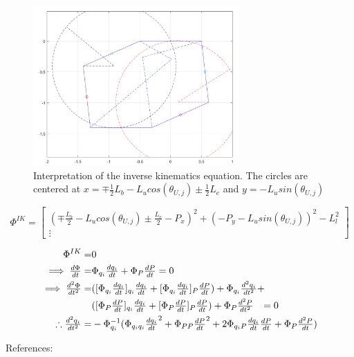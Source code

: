 \begin{figure}[h!]
	\centering
	\includegraphics[width=0.7\textwidth]{figures/Inverse_2D.png}                                                              
	\caption[Interpretation of the inverse kinematics equation]{Interpretation of the inverse kinematics equation. The circles are centered at $x=\mp\tfrac{1}{2}L_b-L_u cos(\theta_{U,j})\pm\tfrac{1}{2}L_e$  and $y=-L_u sin(\theta_{U,j})$}
	\label{fig:inverse2D}
\end{figure}


\begin{equation}
    \Phi^{IK}=
    \begin{bmatrix}
     (\mp \frac{L_b}{2}-L_u cos(\theta_{U,j})\pm\frac{L_e}{2}-P_x)^2+(-P_y-L_u sin(\theta_{U,j}))^2-L_l^2 \\
         \vdots
    \end{bmatrix}
\end{equation}

\begin{align}
\Phi^{IK} =& 0  \nonumber \\
\implies \tfrac{d\Phi}{dt} =&\Phi_{q_i} \tfrac{dq_i}{dt}+\Phi_{P} \tfrac{dP}{dt}  =0\\
\implies 
\tfrac{d^2\Phi}{dt^2} =&([\Phi_{q_i}\tfrac{dq_i}{dt}]_{q_i}\tfrac{dq_i}{dt}+[\Phi_{q_i}\tfrac{dq_i}{dt}]_{P}\tfrac{dP}{dt})+\Phi_{q_i}\tfrac{d^2q_i}{dt^2}+ \nonumber\\
                           &([\Phi_{P}\tfrac{dP}{dt}]_{q_i}\tfrac{dq_i}{dt}+[\Phi_{P}\tfrac{dP}{dt}]_{P}\tfrac{dP}{dt})+\Phi_{P}\tfrac{d^2P}{dt^2}\hphantom{+}=0\\
\therefore  \tfrac{d^2q_i}{dt^2}=&-\Phi_{q_i}^{-1} (\Phi_{q_iq_i}\tfrac{dq_i}{dt}^2+\Phi_{PP}\tfrac{dP}{dt}^2+2\Phi_{q_iP}\tfrac{dq_i}{dt}\tfrac{dP}{dt}+\Phi_P\tfrac{d^2P}{dt}) \label{eq:gammaIK}
\end{align}

References: \cite{Schilder2018} \cite{Hibbeler2013}

